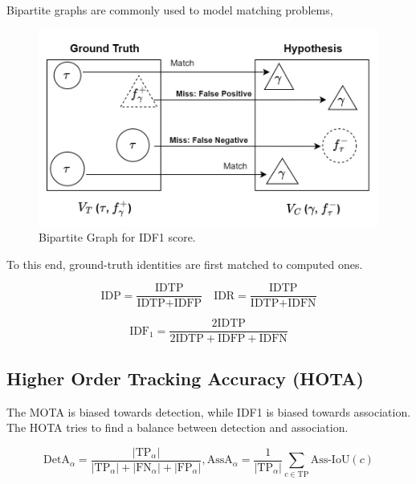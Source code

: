 Bipartite graphs are commonly used to model matching problems,

\begin{figure}[H]
    \centering
    \includegraphics[width=\linewidth]{figures/chapter_tracking/bipartite.jpg}
  \caption{Bipartite Graph for IDF1 score.}
  \label{fig:idf1_bipartite}
\end{figure}

To this end, ground-truth identities are first matched to computed ones.

\begin{equation}
    \text{IDP} = \frac{\text{IDTP}}{\text{IDTP} + \text{IDFP}} \quad 
    \text{IDR} = \frac{\text{IDTP}}{\text{IDTP} + \text{IDFN}}
\end{equation}

\begin{equation}
    \text{IDF}_1 = \frac{2 \text{IDTP}}{2 \text{IDTP} + \text{IDFP} + \text{IDFN}}
\end{equation}

\subsection{Higher Order Tracking Accuracy (HOTA)}

The MOTA is biased towards detection, while IDF1 is biased towards association. The HOTA tries to find a balance between detection and association.

\begin{equation}
    \text{DetA}_{\alpha} = \frac{|\text{TP}_{\alpha}|}{|\text{TP}_\alpha| + |\text{FN}_\alpha| + |\text{FP}_\alpha|},
    \text{AssA}_{\alpha} = \frac{1}{|\text{TP}_\alpha|} \sum_{c \in \text{TP}} \text{Ass-IoU}(c)
\end{equation}

